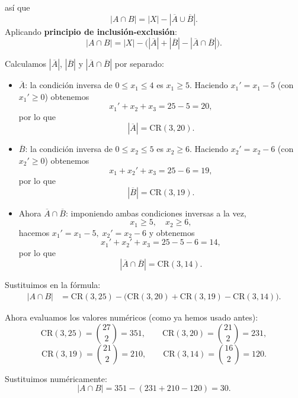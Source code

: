 \documentclass[a4paper,12pt]{article}
\begin{document}
\begin{ejercicio}[title=Ejercicio 31]
así que
\[
|A\cap B| = |X| - |\overline{A}\cup\overline{B}|.
\]
Aplicando \textbf{principio de inclusión-exclusión}:
\[
|A\cap B| = |X| - \big(|\overline{A}| + |\overline{B}| - |\overline{A}\cap\overline{B}|\big).
\]

Calculamos \(|\overline{A}|\), \(|\overline{B}|\) y \(|\overline{A} \cap \overline{B}|\) por separado:

\begin{itemize}

\item \(\overline{A}\): la condición inversa de \(0\le x_1\le 4\) es \(x_1\ge 5\).  
Haciendo \(x_1' = x_1-5\) (con \(x_1'\ge 0\)) obtenemos
\[
x_1' + x_2 + x_3 = 25-5 = 20,
\]
por lo que
\[
|\overline{A}| = \mathrm{CR}(3,20).
\]

\item \(\overline{B}\): la condición inversa de \(0\le x_2\le 5\) es \(x_2\ge 6\).  
Haciendo \(x_2' = x_2-6\) (con \(x_2'\ge 0\)) obtenemos
\[
x_1 + x_2' + x_3 = 25-6 = 19,
\]
por lo que
\[
|\overline{B}| = \mathrm{CR}(3,19).
\]

\item Ahora \(\overline{A}\cap\overline{B}\): imponiendo ambas condiciones inversas a la vez,
\[
x_1\ge 5,\quad x_2\ge 6,
\]
hacemos \(x_1' = x_1-5,\; x_2' = x_2-6\) y obtenemos
\[
x_1' + x_2' + x_3 = 25-5-6 = 14,
\]
por lo que
\[
|\overline{A}\cap\overline{B}| = \mathrm{CR}(3,14).
\]

\end{itemize}

Sustituimos en la fórmula:
\[
\begin{aligned}
|A\cap B|
&= \mathrm{CR}(3,25) - \big(\mathrm{CR}(3,20) + \mathrm{CR}(3,19) - \mathrm{CR}(3,14)\big).
\end{aligned}
\]

Ahora evaluamos los valores numéricos (como ya hemos usado antes):
\[
\mathrm{CR}(3,25)=\binom{27}{2}=351,\qquad
\mathrm{CR}(3,20)=\binom{21}{2}=231,
\]
\[
\mathrm{CR}(3,19)=\binom{21}{2}=210,\qquad
\mathrm{CR}(3,14)=\binom{16}{2}=120.
\]

Sustituimos numéricamente:
\[
|A\cap B| = 351 - (231 + 210 - 120) = \boxed{30}.
\]

\end{ejercicio}
\end{document}

